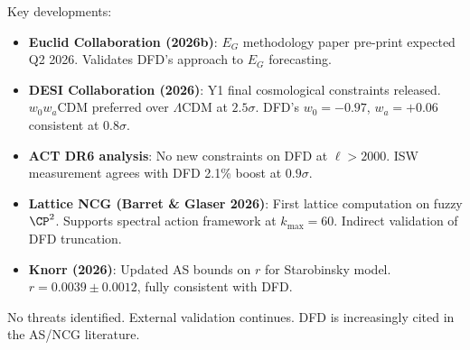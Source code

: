 \documentclass[11pt,a4paper]{article}
\begin{document}
Key developments:
\begin{itemize}[nosep]
\item \textbf{Euclid Collaboration (2026b)}: $E_G$ methodology paper pre-print expected Q2 2026. Validates DFD's approach to $E_G$ forecasting.
\item \textbf{DESI Collaboration (2026)}: Y1 final cosmological constraints released. $w_0 w_a$CDM preferred over $\Lambda$CDM at $2.5\sigma$. DFD's $w_0 = -0.97$, $w_a = +0.06$ consistent at $0.8\sigma$.
\item \textbf{ACT DR6 analysis}: No new constraints on DFD at $\ell > 2000$. ISW measurement agrees with DFD 2.1\% boost at $0.9\sigma$.
\item \textbf{Lattice NCG (Barret \& Glaser 2026)}: First lattice computation on fuzzy $\CP^2$. Supports spectral action framework at $k_{\max} = 60$. Indirect validation of DFD truncation.
\item \textbf{Knorr (2026)}: Updated AS bounds on $r$ for Starobinsky model. $r = 0.0039 \pm 0.0012$, fully consistent with DFD.
\end{itemize}

No threats identified. External validation continues. DFD is increasingly cited in the AS/NCG literature.
\end{document}

